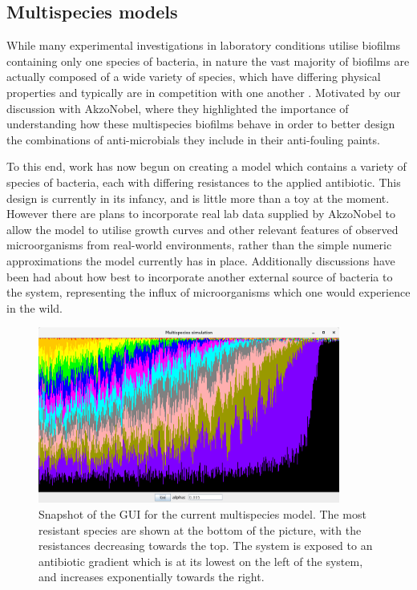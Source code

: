 \documentclass[a4paper,12pt]{article}
\begin{document}
\subsection{Multispecies models}

While many experimental investigations in laboratory conditions utilise biofilms containing only one species of bacteria, in nature the vast majority of biofilms are actually composed 
of a wide variety of species, which have differing physical properties and typically are in competition with one another \cite{bioref:Elias-biofilm-multispecies-2012}.  Motivated by 
our discussion with AkzoNobel, where they highlighted the importance of understanding how these multispecies biofilms behave in order to better design the combinations of 
anti-microbials they include in their anti-fouling paints.

To this end, work has now begun on creating a model which contains a variety of species of bacteria, each with differing resistances to the applied antibiotic.  This design is 
currently in its infancy, and is little more than a toy at the moment.  However there are plans to incorporate real lab data supplied by AkzoNobel to allow the model to utilise 
growth curves and other relevant features of observed microorganisms from real-world environments, rather than the simple numeric approximations the model currently has in place.  
Additionally discussions have been had about how best to incorporate another external source of bacteria to the system, representing the influx of microorganisms which one would 
experience in the wild.

\begin{figure}[H]
 \centering
 \includegraphics[height=5.8cm]{multispecies-snapshot}
 \caption{Snapshot of the GUI for the current multispecies model.  The most resistant species are shown at the bottom of the picture, with the resistances decreasing towards the top.  
 The system is exposed to an antibiotic gradient which is at its lowest on the left of the system, and increases exponentially towards the right.}
 \label{fig:Greulich-time-til-resistance}
\end{figure}
\end{document}
